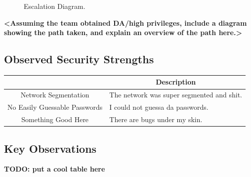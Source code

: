 \begin{fullwidth}
\begin{figure}[H]
    \centering
    \captionsetup{justification=centering}
    \caption{Escalation Diagram.}
\end{figure}

\textbf{<Assuming the team obtained DA/high privileges, include a diagram showing the path taken, and explain an overview of the path here.>}

\subsection{Observed Security Strengths}

\begin{table}[htp]
\centering
\begin{tabular}{|c|p{4in}|}
\hline
\rowcolor[HTML]{C0C0C0} 
\multicolumn{1}{|c|}{\cellcolor[HTML]{C0C0C0}\textbf{Observation}} & \multicolumn{1}{c|}{\cellcolor[HTML]{C0C0C0}\textbf{Description}} \\ \hline
Network Segmentation          & The network was super segmented and shit. \\ \hline
No Easily Guessable Passwords & I could not guessa da passwords.          \\ \hline
Something Good Here           & There are bugs under my skin.             \\ \hline
\end{tabular}
\end{table}

\subsection{Key Observations}

\textbf{TODO: put a cool table here}

\end{fullwidth}